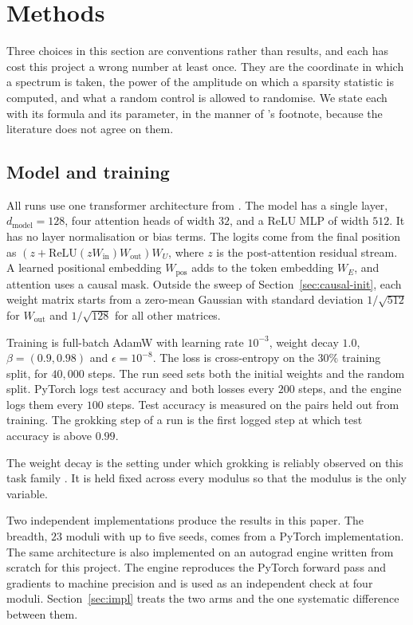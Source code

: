 \section{Methods}
\label{sec:methods}

Three choices in this section are conventions rather than results, and each has cost this
project a wrong number at least once. They are the coordinate in which a spectrum is taken,
the power of the amplitude on which a sparsity statistic is computed, and what a random
control is allowed to randomise. We state each with its formula and its parameter, in the manner of
\citet{doshi2024grokking}'s footnote, because the literature does not agree on them.

\subsection{Model and training}
\label{sec:setup-training}

All runs use one transformer architecture from \citet{nanda2023progress}. The model has a
single layer, $d_{\text{model}} = 128$, four attention heads of width $32$, and a ReLU MLP of
width $512$. It has no layer normalisation or bias terms. The logits come from the final
position as $(z + \mathrm{ReLU}(z W_{\text{in}}) W_{\text{out}}) W_{U}$, where $z$ is the
post-attention residual stream. A learned positional embedding $W_{\text{pos}}$ adds to the
token embedding $W_{E}$, and attention uses a causal mask. Outside the sweep of
Section~\ref{sec:causal-init}, each weight matrix starts from a zero-mean Gaussian with
standard deviation $1/\sqrt{512}$ for $W_{\text{out}}$ and $1/\sqrt{128}$ for all other
matrices.

Training is full-batch AdamW with learning rate $10^{-3}$, weight decay $1.0$,
$\beta = (0.9, 0.98)$ and $\epsilon = 10^{-8}$. The loss is cross-entropy on the $30\%$
training split, for $40{,}000$ steps. The run seed sets both the initial weights and the
random split. PyTorch logs test accuracy and both losses every $200$ steps, and the engine
logs them every $100$ steps. Test accuracy is measured on the pairs held out from
training. The grokking step of a run is the first logged step at which test accuracy is above
$0.99$.

The weight decay is the setting under which grokking is reliably observed on this task
family \citep{power2022grokking}. It is held fixed across every modulus so that the modulus
is the only variable.

Two independent implementations produce the results in this paper. The breadth, $23$ moduli
with up to five seeds, comes from a PyTorch implementation. The same architecture is also
implemented on an autograd engine written from scratch for this project. The engine
reproduces the PyTorch forward pass and gradients to machine precision and is used as an
independent check at four moduli. Section~\ref{sec:impl} treats the two arms and the one
systematic difference between them.

